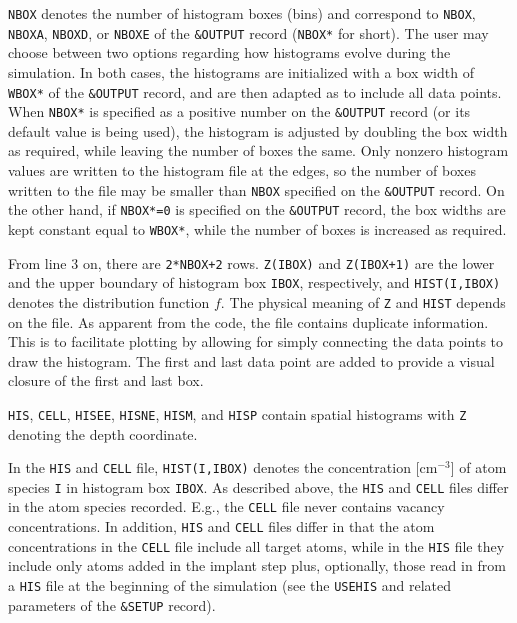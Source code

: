 \texttt{NBOX} denotes the number of histogram boxes (bins) and correspond to
\texttt{NBOX}, \texttt{NBOXA}, \texttt{NBOXD}, or \texttt{NBOXE} of the
\texttt{\&OUTPUT} record (\texttt{NBOX*} for short). The user may choose between
two options regarding how histograms evolve during the simulation. In both
cases, the histograms are initialized with a box width of \texttt{WBOX*} of the
\texttt{\&OUTPUT} record, and are then adapted as to include all data points.
When \texttt{NBOX*} is specified as a positive number on the \texttt{\&OUTPUT}
record (or its default value is being used), the histogram is adjusted by
doubling the box width as required, while leaving the number of boxes the same.
Only nonzero histogram values are written to the histogram file at the edges, so
the number of boxes written to the file may be smaller than \texttt{NBOX}
specified on the \texttt{\&OUTPUT} record. On the other hand, if
\texttt{NBOX*=0} is specified on the \texttt{\&OUTPUT} record, the box widths
are kept constant equal to \texttt{WBOX*}, while the number of boxes is
increased as required.

From line 3 on, there are \texttt{2*NBOX+2} rows. \texttt{Z(IBOX)} and
\texttt{Z(IBOX+1)} are the lower and the upper boundary of histogram box
\texttt{IBOX}, respectively, and \texttt{HIST(I,IBOX)} denotes the distribution
function $f$. The physical meaning of \texttt{Z} and \texttt{HIST} depends on
the file. As apparent from the code, the file contains duplicate information.
This is to facilitate plotting by allowing for simply connecting the data points
to draw the histogram. The first and last data point are added to provide a
visual closure of the first and last box.

\texttt{HIS}, \texttt{CELL}, \texttt{HISEE}, \texttt{HISNE}, \texttt{HISM}, and
\texttt{HISP} contain spatial histograms with \texttt{Z} denoting the depth
coordinate. 

In the \texttt{HIS} and \texttt{CELL} file, \texttt{HIST(I,IBOX)} denotes the
concentration [cm$^{-3}$] of atom species \texttt{I} in histogram box
\texttt{IBOX}. As described above, the \texttt{HIS} and \texttt{CELL} files
differ in the atom species recorded. E.g., the \texttt{CELL} file never contains
vacancy concentrations. In addition, \texttt{HIS} and \texttt{CELL} files differ
in that the atom concentrations in the \texttt{CELL} file include all target
atoms, while in the \texttt{HIS} file they include only atoms added in the
implant step plus, optionally, those read in from a \texttt{HIS} file at the
beginning of the simulation (see the \texttt{USEHIS} and related parameters of
the \texttt{\&SETUP} record). 

